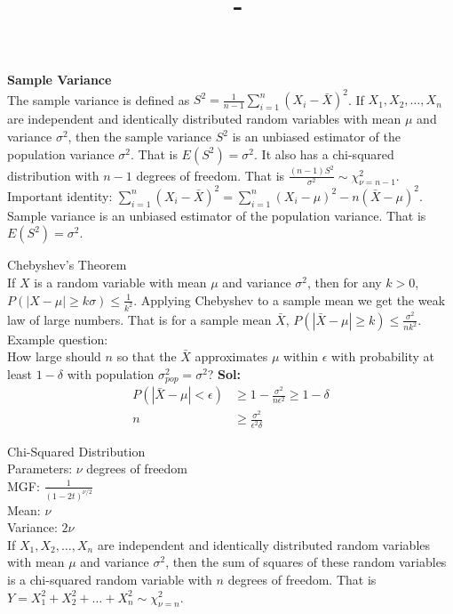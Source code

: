 \documentclass[answers,12pt,addpoints]{exam}
\author{\name}
\title{\course \ - \assignment}
\begin{document}
\maketitle

\begin{definition}
    \textbf{Sample Variance}\\
    The sample variance is defined as $S^2 = \frac{1}{n-1}\sum_{i=1}^{n}(X_i - \bar{X})^2$.
    If $X_1, X_2, \ldots, X_n$ are independent and identically distributed random variables with mean $\mu$ and variance $\sigma^2$, then the sample variance $S^2$ is an unbiased estimator of the population variance $\sigma^2$. That is $E(S^2) = \sigma^2$.
    It also has a chi-squared distribution with $n-1$ degrees of freedom. That is $\frac{(n-1)S^2}{\sigma^2} \sim \chi^2_{\nu = n-1}$.
    Important identity: $\sum_{i=1}^{n}(X_i - \bar{X})^2 = \sum_{i=1}^{n}(X_i - \mu)^2 - n(\bar{X} - \mu)^2$.\\
    Sample variance is an unbiased estimator of the population variance. That is $E(S^2) = \sigma^2$.
\end{definition}
\begin{definition}
    Chebyshev's Theorem\\
    If $X$ is a random variable with mean $\mu$ and variance $\sigma^2$, then for any $k > 0$, $P(|X - \mu| \geq k\sigma) \leq \frac{1}{k^2}$.
    Applying Chebyshev to a sample mean we get the weak law of large numbers. That is for a sample mean $\bar{X}$, $P(|\bar{X} - \mu| \geq k) \leq \frac{\sigma^2}{nk^2}$. 
    Example question: \\
    How large should $n$ so that the $\bar{X}$ approximates $\mu$ within $\epsilon$ with probability at least $1 - \delta$ with population $\sigma_{pop}^2 = \sigma^2$?
    \textbf{Sol:}
    \begin{align*}
        P(|\bar{X} - \mu| < \epsilon) &\geq 1 - \frac{\sigma^2}{n\epsilon^2} \geq 1- \delta\\
        n &\geq \frac{\sigma^2}{\epsilon^2\delta}
    \end{align*}
\end{definition}
\begin{definition}
    Chi-Squared Distribution\\
    Parameters: $\nu$ degrees of freedom\\
    MGF: $\frac{1}{(1-2t)^{\nu/2}}$\\
    Mean: $\nu$\\
    Variance: $2\nu$\\
    If $X_1, X_2, \ldots, X_n$ are independent and identically distributed random variables with mean $\mu$ and variance $\sigma^2$, then the sum of squares of these random variables is a chi-squared random variable with $n$ degrees of freedom. That is $Y = X_1^2 + X_2^2 + \ldots + X_n^2 \sim \chi^2_{\nu = n}$.
\end{definition}
\end{document}
